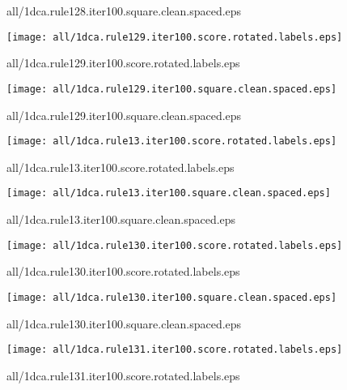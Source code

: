 \documentclass{article}
\begin{document}
{\footnotesize all/1dca.rule128.iter100.square.clean.spaced.eps}
\begin{center}
\begin{minipage}{\textwidth}
\texttt{[image: all/1dca.rule129.iter100.score.rotated.labels.eps]}
\end{minipage}
\end{center}
{\footnotesize all/1dca.rule129.iter100.score.rotated.labels.eps}
\begin{center}
\begin{minipage}{\textwidth}
\texttt{[image: all/1dca.rule129.iter100.square.clean.spaced.eps]}
\end{minipage}
\end{center}
{\footnotesize all/1dca.rule129.iter100.square.clean.spaced.eps}
\begin{center}
\begin{minipage}{\textwidth}
\texttt{[image: all/1dca.rule13.iter100.score.rotated.labels.eps]}
\end{minipage}
\end{center}
{\footnotesize all/1dca.rule13.iter100.score.rotated.labels.eps}
\begin{center}
\begin{minipage}{\textwidth}
\texttt{[image: all/1dca.rule13.iter100.square.clean.spaced.eps]}
\end{minipage}
\end{center}
{\footnotesize all/1dca.rule13.iter100.square.clean.spaced.eps}
\begin{center}
\begin{minipage}{\textwidth}
\texttt{[image: all/1dca.rule130.iter100.score.rotated.labels.eps]}
\end{minipage}
\end{center}
{\footnotesize all/1dca.rule130.iter100.score.rotated.labels.eps}
\begin{center}
\begin{minipage}{\textwidth}
\texttt{[image: all/1dca.rule130.iter100.square.clean.spaced.eps]}
\end{minipage}
\end{center}
{\footnotesize all/1dca.rule130.iter100.square.clean.spaced.eps}
\begin{center}
\begin{minipage}{\textwidth}
\texttt{[image: all/1dca.rule131.iter100.score.rotated.labels.eps]}
\end{minipage}
\end{center}
{\footnotesize all/1dca.rule131.iter100.score.rotated.labels.eps}
\end{document}
